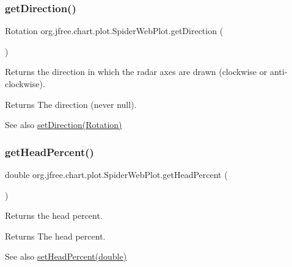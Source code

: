 \subsubsection{\texorpdfstring{get\+Direction()}{getDirection()}}
{\footnotesize\ttfamily Rotation org.\+jfree.\+chart.\+plot.\+Spider\+Web\+Plot.\+get\+Direction (\begin{DoxyParamCaption}{ }\end{DoxyParamCaption})}

Returns the direction in which the radar axes are drawn (clockwise or anti-\/clockwise).

\begin{DoxyReturn}{Returns}
The direction (never {\ttfamily null}).
\end{DoxyReturn}
\begin{DoxySeeAlso}{See also}
\mbox{\hyperlink{classorg_1_1jfree_1_1chart_1_1plot_1_1_spider_web_plot_a298f02b4355b79c7961dbdab899323d9}{set\+Direction(\+Rotation)}} 
\end{DoxySeeAlso}
\mbox{\label{classorg_1_1jfree_1_1chart_1_1plot_1_1_spider_web_plot_a719092ea7539720554b6716f1cd48a16}} 
\subsubsection{\texorpdfstring{get\+Head\+Percent()}{getHeadPercent()}}
{\footnotesize\ttfamily double org.\+jfree.\+chart.\+plot.\+Spider\+Web\+Plot.\+get\+Head\+Percent (\begin{DoxyParamCaption}{ }\end{DoxyParamCaption})}

Returns the head percent.

\begin{DoxyReturn}{Returns}
The head percent.
\end{DoxyReturn}
\begin{DoxySeeAlso}{See also}
\mbox{\hyperlink{classorg_1_1jfree_1_1chart_1_1plot_1_1_spider_web_plot_a747ddb161e3cd2dffee8a0e87737767e}{set\+Head\+Percent(double)}} 
\end{DoxySeeAlso}
\mbox{\label{classorg_1_1jfree_1_1chart_1_1plot_1_1_spider_web_plot_abad1e3eb2dad1089d41ae206a2a56c3a}} 
